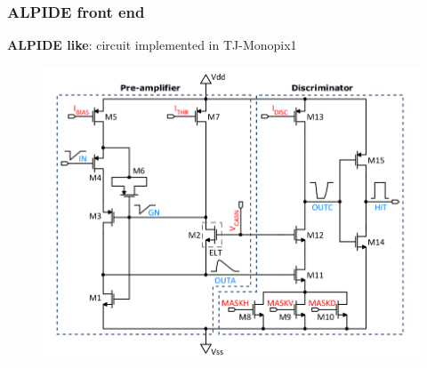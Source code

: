     \begin{frame}[noframenumbering]
        \frametitle{ALPIDE front end}
            \textbf{ALPIDE like}: circuit implemented in TJ-Monopix1
            \begin{figure}[h!]
                \centering
                \includegraphics[width=.8\linewidth]{figures/Monopix1/Monopix1_FE_circuit.png}        
            \end{figure}
    \end{frame}     

